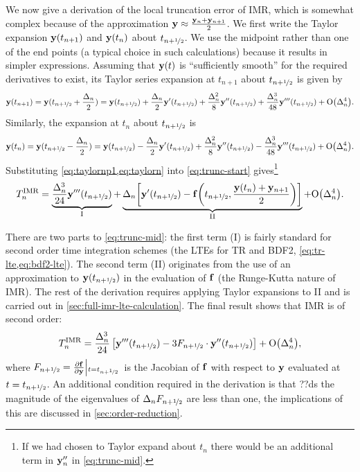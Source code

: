 We now give a derivation of the local truncation error of IMR, which is somewhat complex because of the approximation $\mathbf{y} \approx \frac{\mathbf{y}_n + \mathbf{y}_{n+1}}{2}$.
We first write the Taylor expansion $\mathbf{y}(t_{n+1})$ and $\mathbf{y}(t_{n})$ about $t_{n+\nicefrac{1}{2}}$.
We use the midpoint rather than one of the end points (a typical choice in such calculations) because it results in simpler expressions.
Assuming that $\mathbf{y}(t)$ is ``sufficiently smooth'' for the required derivatives to exist, its Taylor series expansion at $t_{n+1}$ about $t_{n+\nicefrac{1}{2}}$ is given by
\begin{equation}
  \yv(t_{n+1}) = \yv(\thf + \frac{\dtn}{2}) = \yvhf + \frac{\dtn}{2} \yvhf['] 
  + \frac{\dtn^2}{8} \yvhf['']
  + \frac{\dtn^3}{48} \yvhf[''']
  + \order{\dtn^4}.
  \label{eq:taylornp1}
\end{equation}
Similarly, the expansion at $t_n$ about $t_{n+\nicefrac{1}{2}}$ is
\begin{equation}
  \yv(t_n) = \yv(\thf - \frac{\dtn}{2}) = \yvhf - \frac{\dtn}{2} \yvhf['] 
  + \frac{\dtn^2}{8} \yvhf[''] 
  - \frac{\dtn^3}{48} \yvhf['''] 
  + \order{\dtn^4}.
  \label{eq:taylorn}
\end{equation}
Substituting \cref{eq:taylornp1,eq:taylorn} into \cref{eq:trunc-start} gives\footnote{If we had chosen to Taylor expand about $t_n$ there would be an additional term in $\mathbf{y}_n''$ in \cref{eq:trunc-mid}.}
\begin{equation}
  \lte^\imr = \underbrace{\frac{\dtn^3}{24} \yvhf[''']}_{\text{I}}
  + \underbrace{\dtn\bigs{ \yvhf['] - \ffv{\thf, \frac{\yv(t_n) + \yv_{n+1}}{2}} }}_{\text{II}}
  + \order{\dtn^4}.
  \label{eq:trunc-mid}
\end{equation}

There are two parts to \cref{eq:trunc-mid}: the first term (I) is fairly standard for second order time integration schemes (\cf the LTEs for TR and BDF2, \cref{eq:tr-lte,eq:bdf2-lte}).
The second term (II) originates from the use of an approximation to $\mathbf{y}(t_{n+\nicefrac{1}{2}})$ in the evaluation of ${\mathbf{f}}$ (\ie the Runge-Kutta nature of IMR).
The rest of the derivation requires applying Taylor expansions to II and is carried out in \cref{sec:full-imr-lte-calculation}.
The final result shows that IMR is of second order:
\begin{equation}
  \lte^\imr = \frac{\dtn^3}{24} \left[\yvhf['''] - 3 \dfdyhf \cdot \yvhf[''] \right]
  + \order{\dtn^4},
  \label{eq:trunc-final}
\end{equation}
where $F_{n+\nicefrac{1}{2}} = \frac{\partial {\mathbf{f}}}{\partial \mathbf{y}}{\left|_{t=t_{n+\nicefrac{1}{2}}}\right.}$ is the Jacobian of ${\mathbf{f}}$ with respect to $\mathbf{y}$ evaluated at $t=t_{n+\nicefrac{1}{2}}$.
An additional condition required in the derivation is that ??ds the magnitude of the eigenvalues of $\Delta_{n}F_{n+\nicefrac{1}{2}}$ are less than one, the implications of this are discussed in \cref{sec:order-reduction}.


